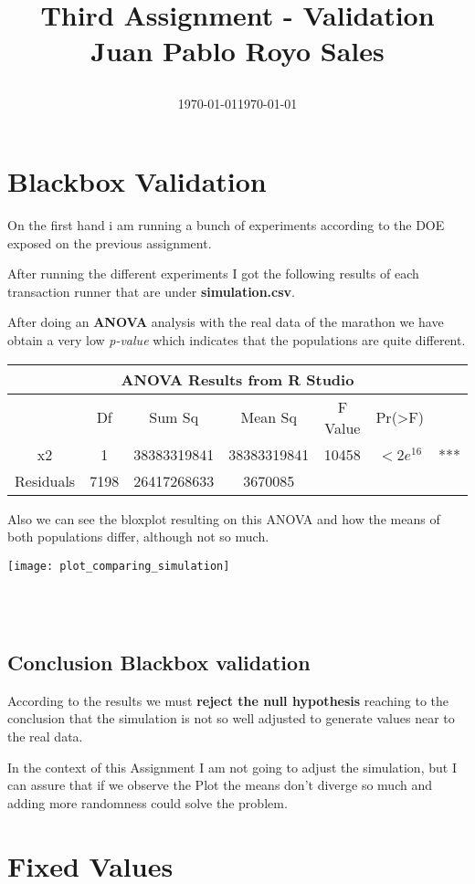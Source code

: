 \documentclass[12pt, a4paper]{article}
\title{
  Third Assignment - Validation\\
  Juan Pablo Royo Sales\\
  \date\today\vspace{-2em}}
\date{\normalize\today}
\begin{document}
\maketitle

\section{Blackbox Validation}

On the first hand i am running a bunch of experiments according to the DOE
exposed on the previous assignment.

After running the different experiments I got the following results of each
transaction runner that are under \textbf{simulation.csv}.

After doing an \textbf{ANOVA} analysis with the real data of the marathon we
have obtain a very low \textit{p-value} which indicates that the populations are quite
different.

\begin{table}[h!]
  \begin{tabular}{ |c|c|c|c|c|c|c|  }
    \hline
    \multicolumn{7}{|c|}{ANOVA Results from R Studio} \\
    \hline
    & Df & Sum Sq & Mean Sq & F Value & Pr(>F) & \\
    \hline
    x2 & 1 & 38383319841 & 38383319841 & 10458 & $<2e^{16}$ & *** \\
    Residuals & 7198 & 26417268633 & 3670085 & & & \\
    \hline
  \end{tabular}
  \label{table:anova}
\end{table}

Also we can see the bloxplot resulting on this ANOVA and how the means of both
populations differ, although not so much.

\begin{minipage}[t]{\linewidth}
  \centering
  \texttt{[image: plot\_comparing\_simulation]}
\end{minipage}\\\\

\subsection{Conclusion Blackbox validation}
According to the results we must \textbf{reject the null hypothesis} reaching to
the conclusion that the simulation is not so well adjusted to generate values
near to the real data.

In the context of this Assignment I am not going to adjust the simulation, but
I can assure that if we observe the Plot the means don't diverge so much and
adding more randomness could solve the problem.


\section{Fixed Values}
\end{document}
